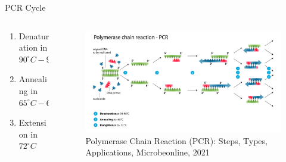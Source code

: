 \documentclass[UKenglish, aspectratio = 169]{beamer}
\begin{document}
\begin{frame}{PCR Cycle}
	\begin{columns}
		\begin{column}{0.4\textwidth}
			\begin{enumerate}[<+->]
				\item<1-> Denaturation in $90^\circ C-95^\circ C$
				\item<2-> Annealing in $65^\circ C-68^\circ C$
				\item<3-> Extension in $72^\circ C$
			\end{enumerate}
		\end{column}
			\begin{column}{0.6\textwidth}
				\onslide<1->
		\begin{figure}
			\centering
			\parbox{\linewidth}{\includegraphics[scale=0.12]{OM-images/pcr_chain.png}}
			\caption{\tiny{Polymerase Chain Reaction (PCR):  Steps, Types, Applications, Microbeonline, 2021}}
		\end{figure}
	\end{column}
	\end{columns}
\end{frame}
\end{document}
